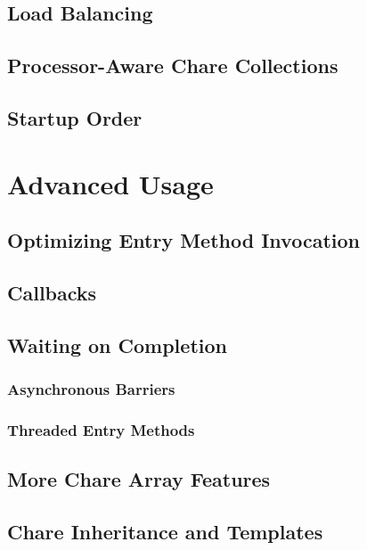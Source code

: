 \documentclass[10pt]{report}
\begin{document}
\chapter{Load Balancing}
  

\chapter{Processor-Aware Chare Collections}
  
  

\chapter{Startup Order}


\part{Advanced Usage}

\chapter{Optimizing Entry Method Invocation}
  
  
  

\chapter{Callbacks}
  

\chapter{Waiting on Completion}
  \section{Asynchronous Barriers}
  \section{Threaded Entry Methods}
  
  

\chapter{More Chare Array Features}
\label{advanced arrays}
  

\chapter{Chare Inheritance and Templates}
\label{inheritance and templates}
  
\end{document}
